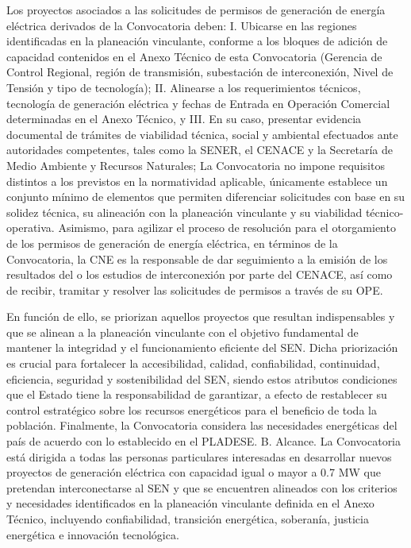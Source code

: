Los proyectos asociados a las solicitudes de permisos de generación de energía eléctrica derivados de la Convocatoria deben:
I. 	Ubicarse en las regiones identificadas en la planeación vinculante, conforme a los bloques de adición de capacidad contenidos en el Anexo Técnico de esta Convocatoria (Gerencia de Control Regional, región de transmisión, subestación de interconexión, Nivel de Tensión y tipo de tecnología);
II. 	Alinearse a los requerimientos técnicos, tecnología de generación eléctrica y fechas de Entrada en Operación Comercial determinadas en el Anexo Técnico, y
III.	En su caso, presentar evidencia documental de trámites de viabilidad técnica, social y ambiental efectuados ante autoridades competentes, tales como la SENER, el CENACE y la Secretaría de Medio Ambiente y Recursos Naturales;
La Convocatoria no impone requisitos distintos a los previstos en la normatividad aplicable, únicamente establece un conjunto mínimo de elementos que permiten diferenciar solicitudes con base en su solidez técnica, su alineación con la planeación vinculante y su viabilidad técnico-operativa.
Asimismo, para agilizar el proceso de resolución para el otorgamiento de los permisos de generación de energía eléctrica, en términos de la Convocatoria, la CNE es la responsable de dar seguimiento a la emisión de los resultados del o los estudios de interconexión por parte del CENACE, así como de recibir, tramitar y resolver las solicitudes de permisos a través de su OPE.\par
En función de ello, se priorizan aquellos proyectos que resultan indispensables y que se alinean a la planeación vinculante con el objetivo fundamental de mantener la integridad y el funcionamiento eficiente del SEN. Dicha priorización es crucial para fortalecer la accesibilidad, calidad, confiabilidad, continuidad, eficiencia, seguridad y sostenibilidad del SEN, siendo estos atributos condiciones que el Estado tiene la responsabilidad de garantizar, a efecto de restablecer su control estratégico sobre los recursos energéticos para el beneficio de toda la población.
Finalmente, la Convocatoria considera las necesidades energéticas del país de acuerdo con lo establecido en el PLADESE.
B. Alcance.
La Convocatoria está dirigida a todas las personas particulares interesadas en desarrollar nuevos proyectos de generación eléctrica con capacidad igual o mayor a 0.7 MW que pretendan interconectarse al SEN y que se encuentren alineados con los criterios y necesidades identificados en la planeación vinculante definida en el Anexo Técnico, incluyendo confiabilidad, transición energética, soberanía, justicia energética e innovación tecnológica.
